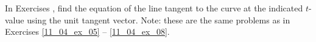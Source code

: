 {\noindent In Exercises}
{ , find the equation of the line tangent to the curve at the indicated $t$-value using the unit tangent vector. Note: these are the same problems as in Exercises \ref{11_04_ex_05} -- \ref{11_04_ex_08}.
}
